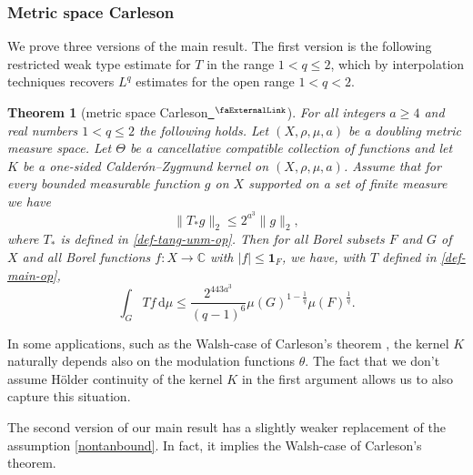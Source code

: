 \documentclass[12pt, reqno]{amsart}
\newcommand*{\complex}{\mathbb{C}} %
\newcommand{\extlink}{~\ensuremath{{}^\text{\faExternalLink}}}
\theoremstyle{definition}
\theoremstyle{plain}
\newtheorem{theorem}{Theorem}[subsection]
\newcommand{\mfa}{{\theta}}
\newcommand{\Mf}{{\Theta}}
\begin{document}
\subsubsection{Metric space Carleson}\label{subsubsec:metric-carleson}

We prove three versions of the main result.
The first version is the following restricted weak type estimate for $T$ in the range $1<q\le 2$,
which by interpolation techniques recovers $L^q$ estimates for the open range $1<q<2$.
\begin{theorem}[metric space Carleson\href{https://github.com/fpvandoorn/carleson/blob/AFM-frozen/Carleson/MetricCarleson/Main.lean\#L203-L208}{\extlink}]
\label{metric-space-Carleson}
    For all integers $a \ge 4$ and real numbers $1<q\le 2$ the following holds.
    Let $(X,\rho,\mu,a)$ be a doubling metric measure space.
    Let $\Mf$ be a cancellative compatible collection of functions and let $K$ be a one-sided Calderón--Zygmund kernel on $(X,\rho,\mu,a)$.
    Assume that for every bounded measurable function $g$ on $X$ supported on a set of finite measure we have
    \begin{equation}\label{nontanbound}
        \|T_{*}g\|_{2} \leq 2^{a^3} \|g\|_2,
    \end{equation}
    where $T_{*}$ is defined in \eqref{def-tang-unm-op}.
    Then for all Borel subsets $F$ and $G$ of $X$ and all Borel functions $f\colon X\to \complex$ with
    $|f|\le \mathbf{1}_F$, we have, with $T$ defined in \eqref{def-main-op},
    \begin{equation*}
        \int_{G} T f \, \mathrm{d}\mu \leq \frac{2^{443a^3}}{(q-1)^6} \mu(G)^{1-\frac{1}{q}} \mu(F)^{\frac{1}{q}}.
    \end{equation*}
\end{theorem}

In some applications, such as the Walsh-case of Carleson's theorem \cite{MR217510}, the kernel $K$ naturally depends also on the modulation functions $\mfa$.
The fact that we don't assume Hölder continuity of the kernel $K$ in the first argument allows us to also capture this situation.

The second version of our main result has a slightly weaker replacement of the assumption \eqref{nontanbound}.
In fact, it implies the Walsh-case of Carleson's theorem.
\end{document}
